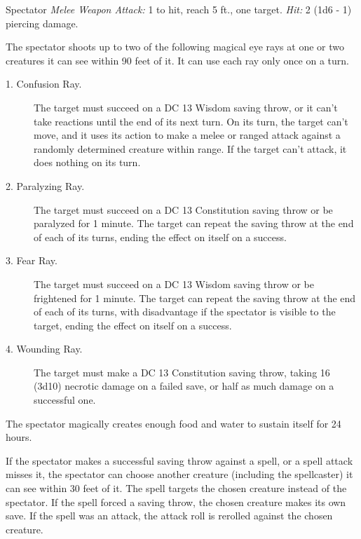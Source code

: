 \documentclass[10pt,a4paper,twoside,bg=print,twocolumn,openany,nodeprecatedcode]{dndbook}
\begin{document}
\begin{DndMonster}[float=t]{Spectator}
\DndMonsterBasics[
armor-class = {14 (natural armor)},
hit-points = {\DndDice{6d8 + 12}},
speed = {0 ft., fly 30 ft. \textit{(hover)}}
]
\DndMonsterAbilityScores[
 str = 8,
 dex = 14,
 con = 14,
 int = 13,
 wis = 14,
 cha = 11
]
\DndMonsterDetails[
skills = {Perception +6},
condition-immunities = {prone},
senses = {darkvision 120 ft., passive perception 16},
languages = {Deep Speech, Undercommon, telepathy 120 ft.},
challenge = 3,
]
\textsl{Melee Weapon Attack:} 1 to hit, reach 5 ft., one target. \textsl{Hit:} 2 (1d6 - 1) piercing damage.

The spectator shoots up to two of the following magical eye rays at one or two creatures it can see within 90 feet of it. It can use each ray only once on a turn.


\begin{description}
\item[1. Confusion Ray.]
The target must succeed on a DC 13 Wisdom saving throw, or it can't take reactions until the end of its next turn. On its turn, the target can't move, and it uses its action to make a melee or ranged attack against a randomly determined creature within range. If the target can't attack, it does nothing on its turn.
\item[2. Paralyzing Ray.]
The target must succeed on a DC 13 Constitution saving throw or be paralyzed for 1 minute. The target can repeat the saving throw at the end of each of its turns, ending the effect on itself on a success.
\item[3. Fear Ray.]
The target must succeed on a DC 13 Wisdom saving throw or be frightened for 1 minute. The target can repeat the saving throw at the end of each of its turns, with disadvantage if the spectator is visible to the target, ending the effect on itself on a success.
\item[4. Wounding Ray.]
The target must make a DC 13 Constitution saving throw, taking 16 (3d10) necrotic damage on a failed save, or half as much damage on a successful one.
\end{description}

The spectator magically creates enough food and water to sustain itself for 24 hours.

If the spectator makes a successful saving throw against a spell, or a spell attack misses it, the spectator can choose another creature (including the spellcaster) it can see within 30 feet of it. The spell targets the chosen creature instead of the spectator. If the spell forced a saving throw, the chosen creature makes its own save. If the spell was an attack, the attack roll is rerolled against the chosen creature.

\end{DndMonster}
\end{document}
